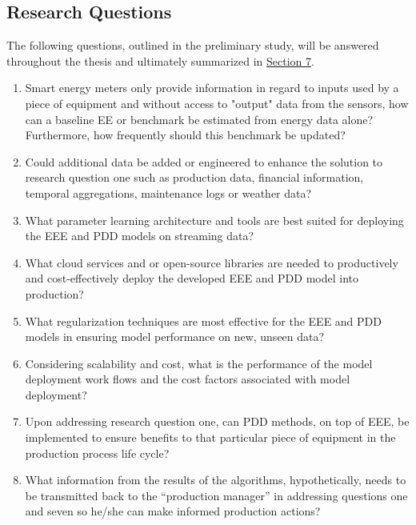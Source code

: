 \subsection{Research Questions}

The following questions, outlined in the preliminary study, will be answered throughout the thesis and ultimately summarized in \hyperlink{section.7}{Section 7}. 

\begin{enumerate}

    \item Smart energy meters only provide information in regard to inputs used by a piece of equipment and without access to "output" data from the sensors, how can a baseline EE or benchmark be estimated from energy data alone? Furthermore, how frequently should this benchmark be updated?
    
    \item Could additional data be added or engineered to enhance the solution to research question one such as production data, financial information, temporal aggregations, maintenance logs or weather data?
    
    \item What parameter learning architecture and tools are best suited for deploying the EEE and PDD models on streaming data?
    
    \item What cloud services and or open-source libraries are needed to productively and cost-effectively deploy the developed EEE and PDD model into production? 
    
    \item What regularization techniques are most effective for the EEE and PDD models in ensuring model performance on new, unseen data?
    
    \item Considering scalability and cost, what is the performance of the model deployment work flows and the cost factors associated with model deployment?
    
    \item Upon addressing research question one, can PDD methods, on top of EEE, be implemented to ensure benefits to that particular piece of equipment in the production process life cycle?
    
    \item What information from the results of the algorithms, hypothetically, needs to be transmitted back to the “production manager” in addressing questions one and seven so he/she can make informed production actions?
    
\end{enumerate}

